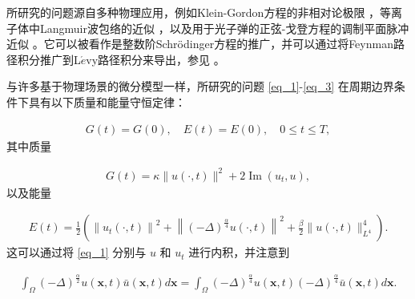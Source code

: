 所研究的问题源自多种物理应用，例如Klein-Gordon方程的非相对论极限 \cite{tsutsumiNonrelativisticApproximationNonlinear1984,machiharaNonrelativisticLimitEnergy2002}，等离子体中Langmuir波包络的近似 \cite{colinSemidiscretizationTimeNonlinear1998}，以及用于光子弹的正弦-戈登方程的调制平面脉冲近似 \cite{baoComparisonsSineGordonPerturbed2010,xinModelingLightBullets2000}。它可以被看作是整数阶Schr{\"o}dinger方程的推广，并可以通过将Feynman路径积分推广到L$\acute{e}$vy路径积分来导出，参见 \cite{laskinFractionalQuantumMechanics2000,laskinFractionalSchrodingerEquation2002}。

与许多基于物理场景的微分模型一样，所研究的问题 \eqref{eq_1}-\eqref{eq_3} 在周期边界条件下具有以下质量和能量守恒定律：

\begin{align}\label{eq_7}
G(t)=G(0), \quad E(t)=E(0), \quad 0 \leq t \leq T,
\end{align}
其中质量

\begin{align}\label{eq_8}
G(t)=\kappa\|u(\cdot, t)\|^{2}+2\operatorname{Im}\left(u_{t}, u\right),
\end{align}
以及能量

\begin{align}\label{eq_9}
E(t)=\frac{1}{2}\left(\left\|u_{t}(\cdot, t)\right\|^{2}+\left\|(-\Delta)^{\frac{\alpha}{4}} u(\cdot, t)\right\|^{2}+\frac{\beta}{2}\|u(\cdot, t)\|_{L^{4}}^{4}\right).
\end{align}
这可以通过将 \eqref{eq_1} 分别与 $u$ 和 $u_{t}$ 进行内积，并注意到

\begin{align} \label{eq_11223}
 	\int_{\Omega}(-\Delta)^{\frac{\alpha}{2}} u(\boldsymbol{x}, t) \bar{u}(\boldsymbol{x}, t) d \boldsymbol{x}=\int_{\Omega}(-\Delta)^{\frac{\alpha}{4}} u(\boldsymbol{x}, t)(-\Delta)^{\frac{\alpha}{4}} \bar{u}(\boldsymbol{x}, t) d \boldsymbol{x}.
 \end{align}

